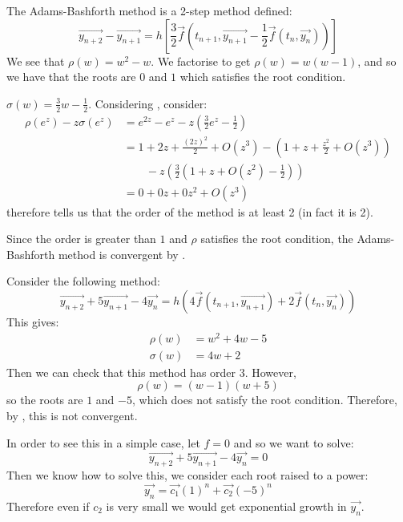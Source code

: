 \documentclass[../Main.tex]{subfiles}
\begin{document}
\begin{example}
    The Adams-Bashforth method is a 2-step method defined:
    \begin{equation*}
        \vec{y_{n+2}} - \vec{y_{n+1}} = h \left[\frac32 \vec{f}(t_{n+1}, \vec{y_{n+1}} - \frac12 \vec{f}(t_n, \vec{y_n}))\right]
    \end{equation*}
    We see that $\rho(w) = w^2 - w$. We factorise to get $\rho(w) = w(w-1)$, and so we have that the roots are $0$ and $1$ which satisfies the root condition.

    $\sigma(w) = \frac32 w - \frac12$. Considering , consider:
    \begin{align*}
        \rho(e^z) - z \sigma(e^z) &= e^{2z} - e^z - z\left(\frac32 e^z - \frac12\right) \\
        &= 1 + 2z + \frac{(2z)^2}{2} + O(z^3) - \left(1 + z + \frac{z^2}{2}+ O(z^3)\right) \\
        &\qquad- z\left(\frac32\left(1 + z + O(z^2) - \frac12\right)\right) \\
        &= 0 + 0z + 0z^2 + O(z^3)
    \end{align*}
    therefore  tells us that the order of the method is at least 2 (in fact it is 2).

    Since the order is greater than $1$ and $\rho$ satisfies the root condition, the Adams-Bashforth method is convergent by .
\end{example}
\begin{example}
    Consider the following method:
    \begin{equation*}
        \vec{y_{n+2}} + 5\vec{y_{n+1}} - 4\vec{y_n} = h\left(4 \vec{f}(t_{n+1}, \vec{y_{n+1}}) + 2 \vec{f}(t_n, \vec{y_n})\right)
    \end{equation*}
    This gives:
    \begin{align*}
        \rho(w) &= w^2 + 4w - 5 \\
        \sigma(w) &= 4w + 2
    \end{align*}
    Then we can check that this method has order 3. However,
    \begin{equation*}
        \rho(w) = (w - 1)(w + 5)
    \end{equation*}
    so the roots are $1$ and $-5$, which does not satisfy the root condition. Therefore, by , this is not convergent.

    In order to see this in a simple case, let $f = 0$ and so we want to solve:
    \begin{equation*}
        \vec{y_{n+2}} + 5\vec{y_{n+1}} - 4\vec{y_n} = 0
    \end{equation*}
    Then we know how to solve this, we consider each root raised to a power:
    \begin{equation*}
        \vec{y_n} = \vec{c_1} (1)^n + \vec{c_2} (-5)^n
    \end{equation*}
    Therefore even if $c_2$ is very small we would get exponential growth in $\vec{y_n}$.
\end{example}
\end{document}
